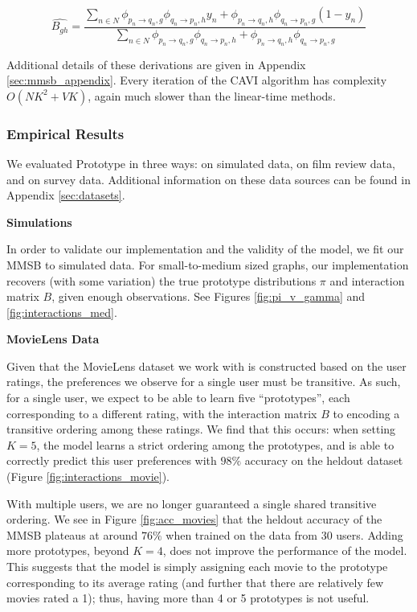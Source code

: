 \[
\hat{B_{gh}} = \frac{
\sum_{n \in N} \phi_{p_n \rightarrow q_n, g} \phi_{q_n \rightarrow p_n, h} y_n + \phi_{p_n \rightarrow q_n, h} \phi_{q_n \rightarrow p_n, g}(1-y_n)
}{
\sum_{n \in N} \phi_{p_n \rightarrow q_n, g} \phi_{q_n \rightarrow p_n, h} + \phi_{p_n \rightarrow q_n, h} \phi_{q_n \rightarrow p_n, g}
}
\]

\bigskip

Additional details of these derivations are given in Appendix \ref{sec:mmsb_appendix}.
Every iteration of the CAVI algorithm has complexity $O(NK^2 + VK)$, again much slower than the linear-time methods.

\subsubsection{Empirical Results}

We evaluated Prototype in three ways: on simulated data, on film review data, and on survey data.
Additional information on these data sources can be found in Appendix \ref{sec:datasets}.

\bigskip

\textbf{Simulations}

\bigskip

In order to validate our implementation and the validity of the model, we fit our MMSB to simulated data.
For small-to-medium sized graphs, our implementation recovers (with some variation) the true prototype distributions $\pi$ and interaction matrix $B$, given enough observations. See Figures \ref{fig:pi_v_gamma} and \ref{fig:interactions_med}.

\bigskip

\textbf{MovieLens Data}

\bigskip

Given that the MovieLens dataset we work with is constructed based on the
user ratings, the preferences we observe for a single user must be transitive.
As such, for a single user, we expect to be able to learn five ``prototypes'', 
each corresponding to a different rating, with the
interaction matrix $B$ to encoding a transitive ordering among these ratings.
We find that this occurs: when setting $K=5$, the model 
learns a strict ordering among the prototypes, and is able to correctly predict 
this user preferences with $98\%$ accuracy on the heldout dataset (Figure \ref{fig:interactions_movie}).  

With multiple users, we are no longer guaranteed a single shared transitive
ordering.
We see in Figure \ref{fig:acc_movies} that the heldout accuracy of the
MMSB plateaus at around $76\%$ when trained on the data from 30 users.
Adding more prototypes, beyond $K=4$, does not improve the
performance of the model. This suggests that the model is simply assigning each
movie to the prototype corresponding to its average rating (and further that there are relatively few movies rated a 1); thus, having more
than 4 or 5 prototypes is not useful.


